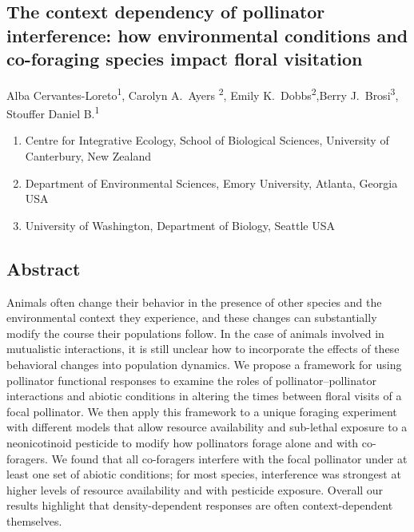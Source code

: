 \begin{refsection}
\chapter{The context dependency of pollinator interference: how environmental conditions and co-foraging species impact floral visitation} %
\label{Bee_foraging}

\noindent Alba Cervantes-Loreto\textsuperscript{1}, Carolyn A.\ Ayers \textsuperscript{2}, Emily K.\ Dobbs\textsuperscript{2},Berry J.\ Brosi\textsuperscript{3}, Stouffer Daniel B.\textsuperscript{1}

\begin{enumerate}
    \item Centre for Integrative Ecology, School of Biological Sciences, University of Canterbury, New Zealand
    \item Department of Environmental Sciences, Emory University, Atlanta, Georgia USA
    \item University of Washington, Department of Biology, Seattle USA
\end{enumerate}

\section*{Abstract}
Animals often change their behavior in the presence of other species and the environmental context they experience, and these changes can substantially modify the course their populations follow. In the case of animals involved in mutualistic interactions, it is still unclear how to incorporate the effects of these behavioral changes into population dynamics. We propose a framework for using pollinator functional responses to examine the roles of pollinator--pollinator interactions and abiotic conditions in altering the times between floral visits of a focal pollinator. We then apply this framework to a unique foraging experiment with different models that allow resource availability and sub-lethal exposure to a neonicotinoid pesticide to modify how pollinators forage alone and with co-foragers. We found that all co-foragers interfere with the focal pollinator under at least one set of abiotic conditions; for most species, interference was strongest at higher levels of resource availability and with pesticide exposure. Overall our results highlight that density-dependent responses are often context-dependent themselves.


\end{refsection}
